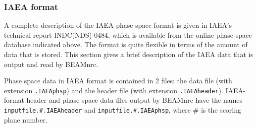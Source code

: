 \documentclass[12pt,twoside]{article}
\begin{document}
\subsubsection{IAEA format}
A complete description of the IAEA phase space format is given in IAEA's
technical report INDC(NDS)-0484\cite{CJ05}, which is available from the online
phase space database indicated above.  The format is quite flexible in
terms of the amount of data that is stored.  This section gives a brief
description of the IAEA data that is output and read by BEAMnrc.

Phase space data in IAEA format is contained in 2 files: the data file
(with extension {\tt .IAEAphsp}) and
the header file (with extension {\tt .IAEAheader}).  IAEA-format header and
phase space data files output
by BEAMnrc have the names {\tt inputfile.\#.IAEAheader} and
{\tt inputfile.\#.IAEAphsp}, where \# is the scoring plane number.
\end{document}
